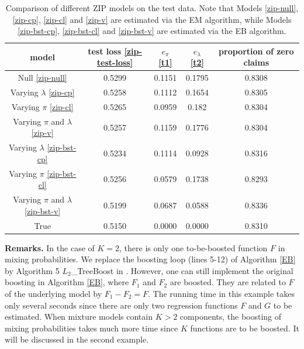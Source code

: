 \documentclass[11pt]{article}
\numberwithin{equation}{section}
\begin{document}
\begin{table}[htp!]
	\caption{Comparison of different ZIP models on the test data. Note that Models \eqref{zip-null}, \eqref{zip-cp}, \eqref{zip-cl} and \eqref{zip-v} are estimated via the EM algorithm, while Models \eqref{zip-bst-cp}, \eqref{zip-bst-cl} and \eqref{zip-bst-v} are estimated via the EB algorithm.} \label{zip}
	\centering
	\begin{tabular}{ccccc}
		
		\hline
		model   & test loss \eqref{zip-test-loss}  & $e_\pi$ \eqref{t1}& $e_\lambda$ \eqref{t2} & proportion of zero claims \\ \hline
		Null \eqref{zip-null}    & 0.5299 & 0.1151     & 0.1795     & 0.8308        \\
		Varying $\lambda$ \eqref{zip-cp} & 0.5258 & 0.1112     & 0.1654     & 0.8305        \\
		Varying $\pi$ \eqref{zip-cl} & 0.5265 & 0.0959     & 0.182      & 0.8304        \\
		Varying $\pi$ and $\lambda$  \eqref{zip-v} & 0.5257 & 0.1159     & 0.1776     & 0.8304        \\
		\hline
		Varying $\lambda$  \eqref{zip-bst-cp} & 0.5234 & 0.1114     & 0.0928     & 0.8316        \\
		Varying $\pi$   \eqref{zip-bst-cl} & 0.5256 & 0.0579     & 0.1738     & 0.8293        \\
		Varying $\pi$ and $\lambda$  \eqref{zip-bst-v}  & 0.5199 & 0.0687     & 0.0588     & 0.8336        \\
		\hline
		True    & 0.5150  & 0.0000         & 0.0000         & 0.8310         \\ \hline
	\end{tabular}
\end{table}

{\bf Remarks.}
In the case of $K=2$, there is only one to-be-boosted function $F$ in mixing probabilities. 
We replace the boosting loop (lines 5-12) of Algorithm \ref{EB} by Algorithm 5 $L_2$\_TreeBoost in \citet{friedman2001greedy}. 
However, one can still implement the original boosting in Algorithm \ref{EB}, where $F_1$ and $F_2$ are boosted. They are related to $F$ of the underlying model by $F_1-F_2=F.$
The running time in this example takes only several seconds since there are only two regression functions $F$ and $G$ to be estimated.
When mixture models contain $K>2$ components, the boosting of mixing probabilities takes much more time since $K$ functions are to be boosted. It will be discussed in the second example.
\end{document}
